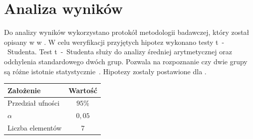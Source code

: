 \section{Analiza wyników}
Do analizy wyników wykorzystano protokół metodologii badawczej, który został opisany w  w . W celu weryfikacji przyjętych hipotez wykonano testy t~-~Studenta. Test t~-~Studenta służy do analizy średniej arytmetycznej oraz odchylenia standardowego dwóch grup. Pozwala na rozpoznanie czy dwie grupy są różne istotnie statystycznie~\cite{tstudent}. Hipotezy zostały postawione dla .

\begin{table}[H]
    \centering
    \begin{tabular}{|l|c|}
        \hline
        \textbf{Założenie} & \textbf{Wartość} \\ \hline
        Przedział ufności  & $95\%$           \\ \hline
        $\alpha$           & $0,05$           \\ \hline
        Liczba elementów   & $7$              \\ \hline
    \end{tabular}
    \label{tab:stat}
\end{table}

